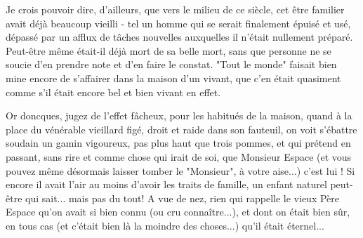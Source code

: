 Je crois pouvoir dire, d'ailleurs, que vers le milieu de ce siècle, cet être familier avait déjà beaucoup vieilli - tel un homme qui se serait finalement épuisé et usé, dépassé par un afflux de tâches nouvelles auxquelles il n'était nullement préparé. Peut-être même était-il déjà mort de sa belle mort, sans que personne ne se soucie d'en prendre note et d'en faire le constat. "Tout le monde" faisait bien mine encore de s'affairer dans la maison d'un vivant, que c'en était quasiment comme s'il était encore bel et bien vivant en effet.

Or doncques, jugez de l'effet fâcheux, pour les habitués de la maison, quand à la place du vénérable vieillard figé, droit et raide dans son fauteuil, on voit s'ébattre soudain un gamin vigoureux, pas plus haut que trois pommes, et qui prétend en passant, sans rire et comme chose qui irait de soi, que Monsieur Espace (et vous pouvez même désormais laisser tomber le "Monsieur", à votre aise...) c'est lui ! Si encore il avait l'air au moins d'avoir les traits de famille, un enfant naturel peut-être qui sait... mais pas du tout! A vue de nez, rien qui rappelle le vieux Père Espace qu'on avait si bien connu (ou cru connaître...), et dont on était bien sûr, en tous cas (et c'était bien là la moindre des choses...) qu'il était éternel...


